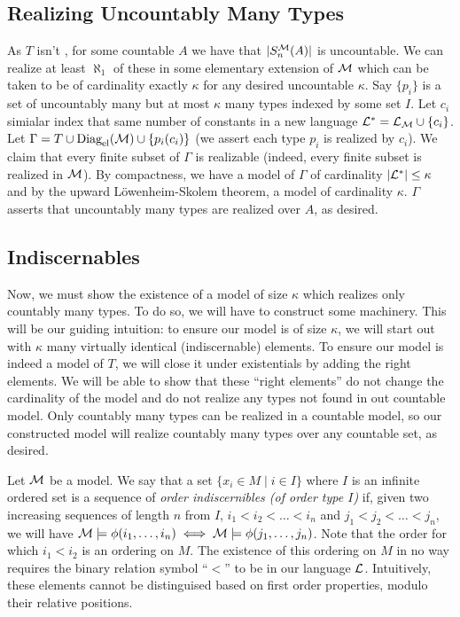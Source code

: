 \subsection{Realizing Uncountably Many Types}
As \(T\) isn't \omst, for some countable \(A\) we have that \(|S_n^{\mathcal{M}}(A)|\) is uncountable. 
We can realize at least \(\aleph_1\) of these in some elementary extension of \(\mathcal{M}\) which can be taken to be of cardinality exactly \(\kappa\) for any desired uncountable \(\kappa\).
Say \(\{p_i\}\) is a set of uncountably many but at most \(\kappa\) many types indexed by some set \(I\). 
Let \(c_i\) simialar index that same number of constants in a new language \(\mathcal{L}^* = \mathcal{L}_{\mathcal{M}} \cup \{c_i\}\). 
Let \(\Gamma = T \cup \text{Diag}_\text{el}(\mathcal{M}) \cup \{p_i(c_i)\}\) (we assert each type \(p_i\) is realized by \(c_i\)). 
We claim that every finite subset of \(\Gamma\) is realizable (indeed, every finite subset is realized in \(\mathcal{M}\)). 
By compactness, we have a model of \(\Gamma\) of cardinality \(|\mathcal{L}^*| \leq \kappa\) and by the upward L\"owenheim-Skolem theorem, a model of cardinality \(\kappa\).
\(\Gamma\) asserts that uncountably many types are realized over \(A\), as desired. 

\subsection{Indiscernables}
Now, we must show the existence of a model of size \(\kappa\) which realizes only countably many types. To do so, we will have to construct some machinery.
This will be our guiding intuition: to ensure our model is of size \(\kappa\), we will start out with \(\kappa\) many virtually identical (indiscernable) elements. 
To ensure our model is indeed a model of \(T\), we will close it under existentials by adding the right elements. 
We will be able to show that these ``right elements'' do not change the cardinality of the model and do not realize any types not found in out countable model.
Only countably many types can be realized in a countable model, so our constructed model will realize countably many types over any countable set, as desired. 

\begin{definition}\label{definition_order_indiscernibles}
Let \(\mathcal{M}\) be a model.
We say that a set \(\{x_i \in M \mid i \in I\}\) where \(I\) is an infinite ordered set is a sequence of \textit{order indiscernibles (of order type \(I\))} if, given two increasing sequences of length \(n\) from \(I\), 
\(i_1 < i_2 < \ldots < i_n\) and \(j_1 < j_2 < \ldots < j_n\), we will have \(\mathcal{M} \models \phi(i_1, \ldots, i_n) \iff \mathcal{M} \models \phi(j_1, \ldots, j_n)\). 
Note that the order for which \(i_1 < i_2\) is an ordering on \(M\).
The existence of this ordering on \(M\) in no way requires the binary relation symbol ``\(<\)'' to be in our language \(\mathcal{L}\). 
Intuitively, these elements cannot be distinguised based on first order properties, modulo their relative positions.  
\end{definition}

